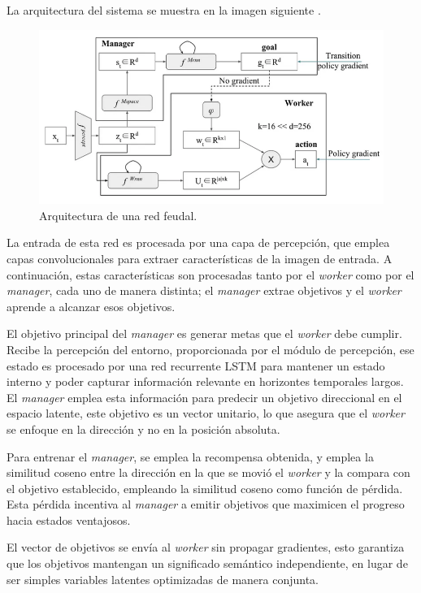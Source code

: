 \documentclass[letterpaper]{article} %
\begin{document}
La arquitectura del sistema se muestra en la imagen siguiente \cite{feudal_networks_2024}.

\begin{figure}[H]
    \centering
    \includegraphics[width=0.9\columnwidth]{feudal_arquitecture.png}
    \caption{Arquitectura de una red feudal.\label{fig:arquitectura_feudal}}
\end{figure}

La entrada de esta red es procesada por una capa de percepción, que emplea capas convolucionales
para extraer características de la imagen de entrada. A continuación, estas características son procesadas
tanto por el \textit{worker} como por el \textit{manager}, cada uno de manera distinta; el \textit{manager} extrae objetivos y el \textit{worker}
aprende a alcanzar esos objetivos.

El objetivo principal del \textit{manager} es generar metas que el \textit{worker} debe cumplir. Recibe la percepción
del entorno, proporcionada por el módulo de percepción, ese estado es procesado por una red recurrente LSTM
para mantener un estado interno y poder capturar información relevante en horizontes temporales largos.
El \textit{manager} emplea esta información para predecir un objetivo direccional en el espacio latente, este objetivo
es un vector unitario, lo que asegura que el \textit{worker} se enfoque en la dirección y no en la posición absoluta.

Para entrenar el \textit{manager}, se emplea la recompensa obtenida, y emplea la similitud coseno entre la dirección en la que 
se movió el \textit{worker} y la compara con el objetivo establecido, empleando la similitud coseno como función de pérdida.
Esta pérdida incentiva al \textit{manager} a emitir objetivos que maximicen el progreso hacia estados ventajosos.

El vector de objetivos se envía al \textit{worker} sin propagar gradientes, esto garantiza que los objetivos 
mantengan un significado semántico independiente, en lugar de ser simples variables latentes optimizadas de manera conjunta.
\end{document}
